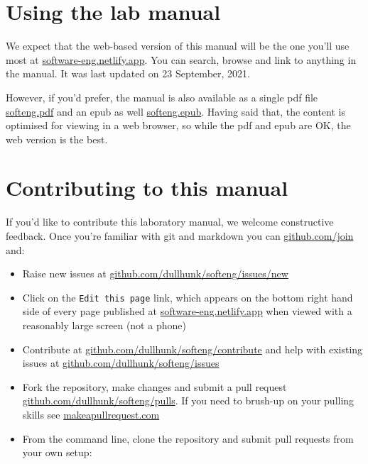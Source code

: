 \documentclass[
]{book}
\providecommand{\tightlist}{%
  \setlength{\itemsep}{0pt}\setlength{\parskip}{0pt}}
\begin{document}
\hypertarget{usingit}{%
\section{Using the lab manual}\label{usingit}}

We expect that the web-based version of this manual will be the one you'll use most at \href{https://software-eng.netlify.app/}{software-eng.netlify.app}. You can search, browse and link to anything in the manual. It was last updated on 23 September, 2021.

However, if you'd prefer, the manual is also available as a single pdf file \href{https://software-eng.netlify.app/softeng.pdf}{softeng.pdf} and an epub as well \href{https://software-eng.netlify.app/softeng.epub}{softeng.epub}. Having said that, the content is optimised for viewing in a web browser, so while the pdf and epub are OK, the web version is the best.

\hypertarget{contributing}{%
\section{Contributing to this manual}\label{contributing}}

If you'd like to contribute this laboratory manual, we welcome constructive feedback. Once you're familiar with git and markdown you can \href{https://github.com/join}{github.com/join} and:

\begin{itemize}
\tightlist
\item
  Raise new issues at \href{https://github.com/dullhunk/softeng/issues/new}{github.com/dullhunk/softeng/issues/new}
\item
  Click on the \texttt{Edit\ this\ page} link, which appears on the bottom right hand side of every page published at \href{https://software-eng.netlify.app}{software-eng.netlify.app} when viewed with a reasonably large screen (not a phone)
\item
  Contribute at \href{https://github.com/dullhunk/softeng/contribute}{github.com/dullhunk/softeng/contribute} and help with existing issues at \href{https://github.com/dullhunk/softeng/issues}{github.com/dullhunk/softeng/issues}
\item
  Fork the repository, make changes and submit a pull request \href{https://github.com/dullhunk/softeng/pulls}{github.com/dullhunk/softeng/pulls}. If you need to brush-up on your pulling skills see \href{http://makeapullrequest.com/}{makeapullrequest.com}
\item
  From the command line, clone the repository and submit pull requests from your own setup:
\end{itemize}
\end{document}

